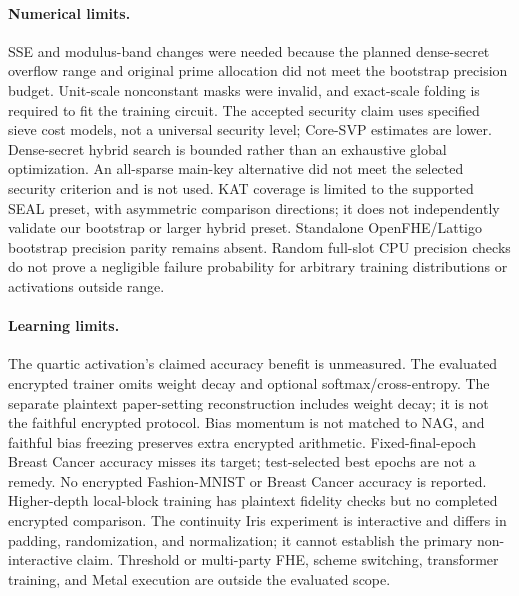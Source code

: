 \paragraph{Numerical limits.}
SSE and modulus-band changes were needed because the planned dense-secret overflow range and original prime allocation did not meet the bootstrap precision budget. Unit-scale nonconstant masks were invalid, and exact-scale folding is required to fit the training circuit. The accepted security claim uses specified sieve cost models, not a universal security level; Core-SVP estimates are lower. Dense-secret hybrid search is bounded rather than an exhaustive global optimization. An all-sparse main-key alternative did not meet the selected security criterion and is not used. KAT coverage is limited to the supported SEAL preset, with asymmetric comparison directions; it does not independently validate our bootstrap or larger hybrid preset. Standalone OpenFHE/Lattigo bootstrap precision parity remains absent. Random full-slot CPU precision checks do not prove a negligible failure probability for arbitrary training distributions or activations outside range.

\paragraph{Learning limits.}
The quartic activation's claimed accuracy benefit is unmeasured. The evaluated encrypted trainer omits weight decay and optional softmax/cross-entropy. The separate plaintext paper-setting reconstruction includes weight decay; it is not the faithful encrypted protocol. Bias momentum is not matched to NAG, and faithful bias freezing preserves extra encrypted arithmetic. Fixed-final-epoch Breast Cancer accuracy misses its target; test-selected best epochs are not a remedy. No encrypted Fashion-MNIST or Breast Cancer accuracy is reported. Higher-depth local-block training has plaintext fidelity checks but no completed encrypted comparison. The continuity Iris experiment is interactive and differs in padding, randomization, and normalization; it cannot establish the primary non-interactive claim. Threshold or multi-party FHE, scheme switching, transformer training, and Metal execution are outside the evaluated scope.

